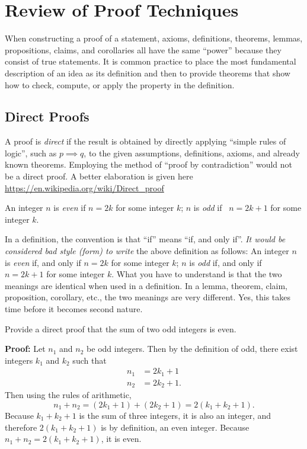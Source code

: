 \section{Review of Proof Techniques}

When constructing a proof of a statement, axioms, definitions, theorems, lemmas, propositions, claims, and corollaries all have the same ``power'' because they consist of true statements. It is common practice to place the most fundamental description of an idea as its definition and then to provide theorems that show how to check, compute, or apply the property in the definition.

\subsection{Direct Proofs}
A proof is \emph{direct} if the result is obtained by directly applying ``simple rules of logic'', such as $p \implies q$, to the given assumptions, definitions, axioms, and already known theorems. Employing the method of ``proof by contradiction'' would not be a direct proof. A better elaboration is given here \url{https://en.wikipedia.org/wiki/Direct_proof}\\

\begin{definition}
An integer $n$ is \emph{even} if $n = 2k$ for some integer $k$; $n$ is \emph{odd} if \ $n = 2k+1$ for some integer $k$. 
\end{definition} 

\begin{rem}
In a definition, the convention is that ``if'' means ``if, and only if''. \emph{It would be considered bad style (form) to write} the above definition as follows: An integer $n$ is \emph{even} if, and only if $n = 2k$ for some integer $k$; $n$ is \emph{odd} if, and only if \ $n = 2k+1$ for some integer $k$. What you have to understand is that the two meanings are identical when used in a definition. In a lemma, theorem, claim, proposition, corollary, etc., the two meanings are very different. Yes, this takes time before it becomes second nature.
\end{rem} 

\begin{example} 
Provide a direct proof that the sum of two odd integers is even.
\end{example}

\textbf{Proof:} Let $n_1$ and $n_2$ be odd integers. Then by the definition of odd, there exist integers $k_1$ and $k_2$ such that
    \begin{align*}
        n_1 &= 2k_1+1\\
        n_2 &= 2k_2+1.
    \end{align*}
Then using the rules of arithmetic, 
    \begin{equation*}
        n_1+n_2 = (2k_1+1) + (2k_2+1) = 2(k_1+k_2+1).
    \end{equation*}
Because $k_1+k_2+1$ is the sum of three integers, it is also an integer, and therefore $2(k_1+k_2+1)$ is by definition, an even integer. Because $n_1+n_2=2(k_1+k_2+1)$, it is even. 
\Qed

